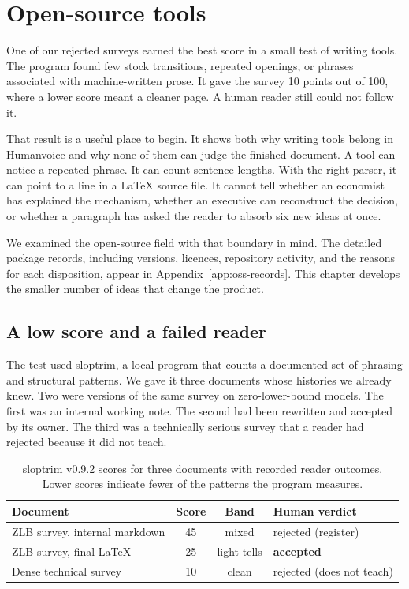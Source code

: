 \chapter{Open-source tools}
\label{sec:oss}

One of our rejected surveys earned the best score in a small test of writing
tools. The program found few stock transitions, repeated openings, or phrases
associated with machine-written prose. It gave the survey 10 points out of
100, where a lower score meant a cleaner page. A human reader still could not
follow it.

That result is a useful place to begin. It shows both why writing tools belong
in Humanvoice and why none of them can judge the finished document. A tool can
notice a repeated phrase. It can count sentence lengths. With the right parser,
it can point to a line in a LaTeX source file. It cannot tell whether an
economist has explained the mechanism, whether an executive can reconstruct
the decision, or whether a paragraph has asked the reader to absorb six new
ideas at once.

We examined the open-source field with that boundary in mind. The detailed
package records, including versions, licences, repository activity, and the
reasons for each disposition, appear in Appendix~\ref{app:oss-records}. This
chapter develops the smaller number of ideas that change the product.

\section{A low score and a failed reader}
\label{sec:oss-calibration}

The test used sloptrim, a local program that counts a documented set of
phrasing and structural patterns. We gave it three documents whose histories
we already knew. Two were versions of the same survey on zero-lower-bound
models. The first was an internal working note. The second had been rewritten
and accepted by its owner. The third was a technically serious survey that a
reader had rejected because it did not teach.

\begin{table}[H]
\centering
\small
\begin{tabular}{@{}lccl@{}}
\toprule
Document & Score & Band & Human verdict \\
\midrule
ZLB survey, internal markdown & 45 & mixed & rejected (register) \\
ZLB survey, final LaTeX & 25 & light tells & \textbf{accepted} \\
Dense technical survey & 10 & clean & rejected (does not teach) \\
\bottomrule
\end{tabular}
\caption{sloptrim v0.9.2 scores for three documents with recorded reader
outcomes. Lower scores indicate fewer of the patterns the program measures.}
\label{tab:calibration}
\end{table}

